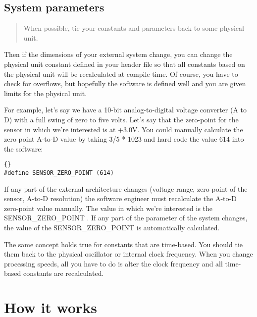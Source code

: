 \documentclass{report}
\begin{document}
\section{System parameters}
\begin{quote}
When possible, tie your constants and parameters back to some physical unit.
\end{quote}
Then if the dimensions of your external system change, you can change the physical unit constant defined in your header file so that all constants based on the physical unit will be recalculated at compile time. Of course, you have to check for overflows, but hopefully the software is defined well and you are given limits for the physical unit.

For example, let's say we have a 10-bit analog-to-digital voltage converter (A to D) with a full swing of zero to five volts. Let's say that the zero-point for the sensor in which we're interested is at +3.0V. You could manually calculate the zero point A-to-D value by taking 3/5 * 1023 and hard code the value 614 into the software: 
\begin{lstlisting}{}
#define SENSOR_ZERO_POINT (614)
\end{lstlisting}
If any part of the external architecture changes (voltage range, zero point of the sensor, A-to-D resolution) the software engineer must recalculate the A-to-D zero-point value manually. The value in which we're interested is the SENSOR\_ZERO\_POINT . If any part of the parameter of the system changes, the value of the SENSOR\_ZERO\_POINT is automatically calculated.

The same concept holds true for constants that are time-based. You should tie them back to the physical oscillator or internal clock frequency. When you change processing speeds, all you have to do is alter the clock frequency and all time-based constants are recalculated. 



\chapter{How it works}


\end{document}
